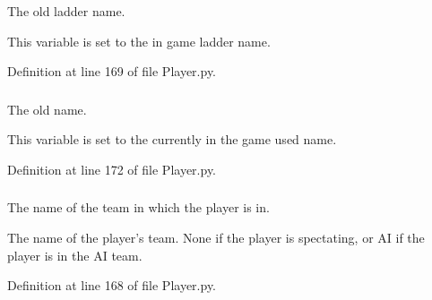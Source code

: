 The old ladder name. 

This variable is set to the in game ladder name. 

Definition at line 169 of file Player.py.

\hypertarget{class_player_1_1_player_a43d105f816af7ba2c6dbe816ffaf4eba}{
\subsubsection[{\_\-\_\-old\_\-name}]{}}
\label{class_player_1_1_player_a43d105f816af7ba2c6dbe816ffaf4eba}


The old name. 

This variable is set to the currently in the game used name. 

Definition at line 172 of file Player.py.

\hypertarget{class_player_1_1_player_ae01a2cfd1449c211cc6b6ca6d6fce853}{
\subsubsection[{\_\-\_\-team}]{}}
\label{class_player_1_1_player_ae01a2cfd1449c211cc6b6ca6d6fce853}


The name of the team in which the player is in. 

The name of the player's team. None if the player is spectating, or AI if the player is in the AI team. 

Definition at line 168 of file Player.py.

\hypertarget{class_player_1_1_player_a323d688193f511184787b2e598222e74}{
\subsubsection[{color}]{}}
\label{class_player_1_1_player_a323d688193f511184787b2e598222e74}


